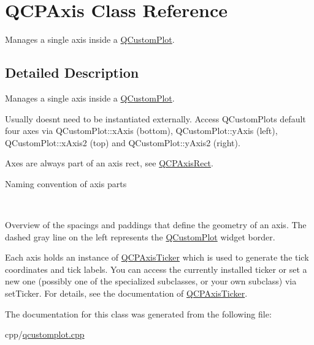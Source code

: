 \hypertarget{class_q_c_p_axis}{}\section{Q\+C\+P\+Axis Class Reference}
\label{class_q_c_p_axis}


Manages a single axis inside a \mbox{\hyperlink{class_q_custom_plot}{Q\+Custom\+Plot}}.  




\subsection{Detailed Description}
Manages a single axis inside a \mbox{\hyperlink{class_q_custom_plot}{Q\+Custom\+Plot}}. 

Usually doesn\textquotesingle{}t need to be instantiated externally. Access Q\+Custom\+Plot\textquotesingle{}s default four axes via Q\+Custom\+Plot\+::x\+Axis (bottom), Q\+Custom\+Plot\+::y\+Axis (left), Q\+Custom\+Plot\+::x\+Axis2 (top) and Q\+Custom\+Plot\+::y\+Axis2 (right).

Axes are always part of an axis rect, see \mbox{\hyperlink{class_q_c_p_axis_rect}{Q\+C\+P\+Axis\+Rect}}.  \begin{center}Naming convention of axis parts\end{center}  ~\newline
  \begin{center}Overview of the spacings and paddings that define the geometry of an axis. The dashed gray line on the left represents the \mbox{\hyperlink{class_q_custom_plot}{Q\+Custom\+Plot}} widget border.\end{center} 

Each axis holds an instance of \mbox{\hyperlink{class_q_c_p_axis_ticker}{Q\+C\+P\+Axis\+Ticker}} which is used to generate the tick coordinates and tick labels. You can access the currently installed ticker or set a new one (possibly one of the specialized subclasses, or your own subclass) via set\+Ticker. For details, see the documentation of \mbox{\hyperlink{class_q_c_p_axis_ticker}{Q\+C\+P\+Axis\+Ticker}}. 

The documentation for this class was generated from the following file\+:\begin{DoxyCompactItemize}
\item 
cpp/\mbox{\hyperlink{qcustomplot_8cpp}{qcustomplot.\+cpp}}\end{DoxyCompactItemize}
